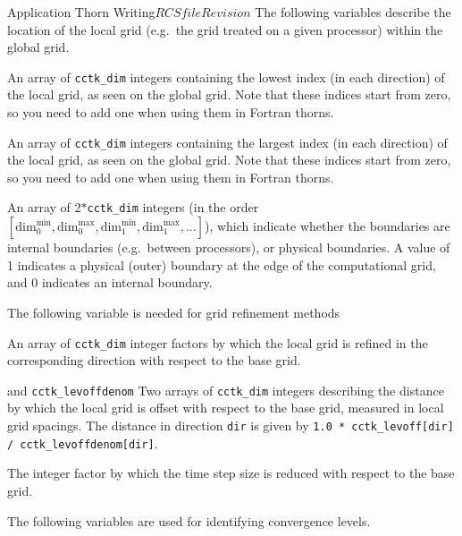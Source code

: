 \begin{cactuspart}{Application Thorn Writing}{$RCSfile$}{$Revision$}
The following variables describe the location of the local
grid (e.g.\ the grid treated on a given processor) within
the global grid.
\begin{Lentry}
\item [\texttt{cctk\_lbnd}]
      An array of \texttt{cctk\_dim} integers
      containing the lowest index (in each direction)
      of the local grid, as seen on the global grid. Note that these indices
      start from zero, so you need to add one when using them in
      Fortran thorns.
\item [\texttt{cctk\_ubnd}]
      An array of \texttt{cctk\_dim} integers
      containing the largest index (in each direction)
      of the local grid, as seen on the global grid.  Note that these indices
      start from zero, so you need to add one when using them in
      Fortran thorns.
\item [\texttt{cctk\_bbox}]
      An array of 2$*$\texttt{cctk\_dim} integers (in the order
        $[\mbox{dim}_0^{\mbox{min}}, \mbox{dim}_0^{\mbox{max}},
        \mbox{dim}_1^{\mbox{min}}, \mbox{dim}_1^{\mbox{max}}, \ldots]$),
      which indicate whether the boundaries are internal boundaries
      (e.g.\ between processors), or physical boundaries.
      A value of 1 indicates
      a physical (outer) boundary at the edge of the computational grid,
      and 0 indicates an internal boundary.
\end{Lentry}

The following variable is needed for grid refinement methods
\begin{Lentry}
\item [\texttt{cctk\_levfac}] An array of \texttt{cctk\_dim} integer factors
        by which the local grid is refined in the corresponding
        direction with respect to the base grid.
\item [\texttt{cctk\_levoff}] and \texttt{cctk\_levoffdenom} Two arrays of
        \texttt{cctk\_dim} integers describing the distance by which the
        local grid is offset with respect to the base grid, measured
        in local grid spacings.  The distance in direction \texttt{dir}
        is given by \texttt{1.0 * cctk\_levoff[dir] /
        cctk\_levoffdenom[dir]}.
\item [\texttt{cctk\_timefac}] The integer factor
        by which the time step size is reduced with respect to the
        base grid.
\end{Lentry}

The following variables are used for identifying convergence levels.


\end{cactuspart}
